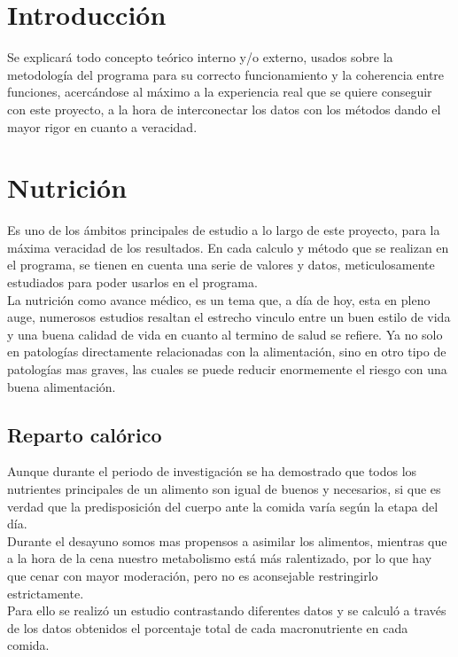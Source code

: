 
\section{Introducción}
Se explicará todo concepto teórico interno y/o externo, usados sobre la metodología del programa para su correcto funcionamiento y la coherencia entre funciones, acercándose al máximo a la experiencia real que se quiere conseguir con este proyecto, a la hora de interconectar los datos con los métodos dando el mayor rigor en cuanto a veracidad.
\section{Nutrición}
Es uno de los ámbitos principales de estudio a lo largo de este proyecto, para la máxima veracidad de los resultados. En cada calculo y método que se realizan en el programa, se tienen en cuenta una serie de valores y datos, meticulosamente estudiados para poder usarlos en el programa.\\

La nutrición como avance médico, es un tema que, a día de hoy, esta en pleno auge, numerosos estudios resaltan el estrecho vinculo entre un buen estilo de vida y una buena calidad de vida en cuanto al termino de salud se refiere. Ya no solo en patologías directamente relacionadas con la alimentación, sino en otro tipo de patologías mas graves, las cuales se puede reducir enormemente el riesgo con una buena alimentación.\cite{prevCancer}
\subsection{Reparto calórico}

Aunque durante el periodo de investigación se ha demostrado que todos los nutrientes principales de un alimento son igual de buenos y necesarios, si que es verdad que la predisposición del cuerpo ante la comida varía según la etapa del día. \\

Durante el desayuno somos mas propensos a asimilar los alimentos, mientras que a la hora de la cena nuestro metabolismo está más ralentizado, por lo que hay que cenar con mayor moderación, pero no es aconsejable restringirlo estrictamente.\\

Para ello se realizó un estudio contrastando diferentes datos y se calculó a través de los datos obtenidos el porcentaje total de cada macronutriente en cada comida.
